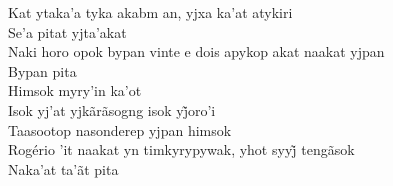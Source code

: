 \bigskip

\begin{linenumbers}\begingroup\raggedright
 
\noindent   Kat ytaka'a tyka akabm an, yjxa ka'at atykiri\\
  Se'a pitat yjta'akat\\
  Naki horo opok bypan vinte e dois apykop akat naakat yjpan\\
  Bypan pita\\
  Himsok myry'in ka'ot\\
  Isok yj’at yjkãrãsogng isok yj̃oro’i\\
  Taasootop nasonderep yjpan himsok\\
  Rogério ’it naakat yn timkyrypywak, yhot syyj̃ tengãsok\\
  Naka'at ta'ãt pita
 
\end{linenumbers}\endgroup

\bigskip

